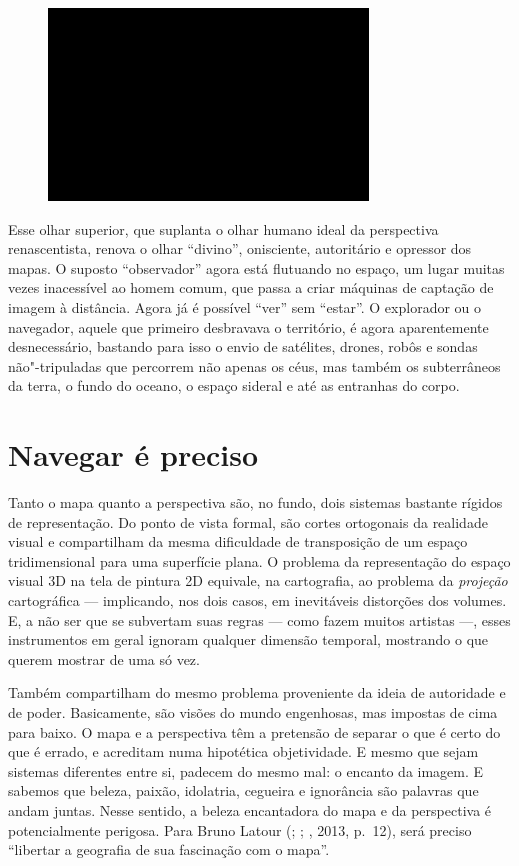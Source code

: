 \begin{figure}[!ht]

\centering
 \includegraphics[width=85mm]{./imgs/im1.jpg}
\caption{\tiny{}}

\end{figure}

Esse olhar superior, que suplanta o olhar humano ideal da perspectiva
renascentista, renova o olhar ``divino'', onisciente, autoritário e
opressor dos mapas. O suposto ``observador'' agora está flutuando no
espaço, um lugar muitas vezes inacessível ao homem comum, que passa a
criar máquinas de captação de imagem à distância. Agora já é possível
``ver'' sem ``estar''. O explorador ou o navegador, aquele que primeiro
desbravava o território, é agora aparentemente desnecessário, bastando
para isso o envio de satélites, drones, robôs e sondas não"-tripuladas
que percorrem não apenas os céus, mas também os subterrâneos da terra, o
fundo do oceano, o espaço sideral e até as entranhas do corpo.

\chapter{Navegar é preciso}

Tanto o mapa quanto a perspectiva são, no fundo, dois sistemas bastante
rígidos de representação. Do ponto de vista formal, são cortes
ortogonais da realidade visual e compartilham da mesma dificuldade de
transposição de um espaço tridimensional para uma superfície plana. O
problema da representação do espaço visual 3D na tela de pintura 2D
equivale, na cartografia, ao problema da \emph{projeção} cartográfica
--- implicando, nos dois casos, em inevitáveis distorções dos volumes.
E, a não ser que se subvertam suas regras --- como fazem muitos artistas
---, esses instrumentos em geral ignoram qualquer dimensão temporal,
mostrando o que querem mostrar de uma só vez.

Também compartilham do mesmo problema proveniente da ideia de autoridade
e de poder. Basicamente, são visões do mundo engenhosas, mas impostas de
cima para baixo. O mapa e a perspectiva têm a pretensão de separar o que
é certo do que é errado, e acreditam numa hipotética objetividade. E
mesmo que sejam sistemas diferentes entre si, padecem do mesmo mal: o
encanto da imagem. E sabemos que beleza, paixão, idolatria, cegueira e
ignorância são palavras que andam juntas. Nesse sentido, a beleza
encantadora do mapa e da perspectiva é potencialmente perigosa. Para
Bruno Latour (; ; , 2013, p.~12), será
preciso ``libertar a geografia de sua fascinação com o mapa''.

